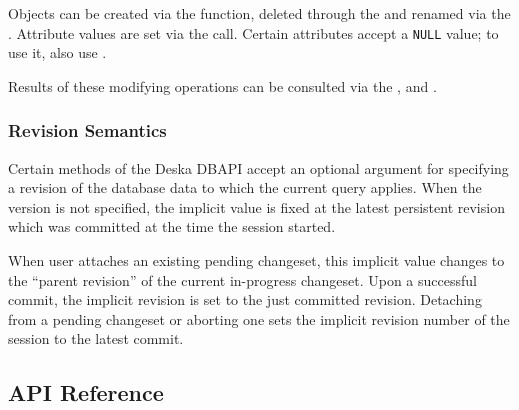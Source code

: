 \documentclass{article}
\begin{document}
Objects can be created via the  function, deleted through the  and
renamed via the .  Attribute values are set via the  call.
Certain attributes accept a {\tt NULL} value; to use it, also use .

Results of these modifying operations can be consulted via the ,
 and .

\subsubsection{Revision Semantics}
\label{sec:api-revision-semantics}

Certain methods of the Deska DBAPI accept an optional argument for specifying a revision of the database data to which
the current query applies.  When the version is not specified, the implicit value is fixed at the latest persistent
revision which was committed at the time the session started.

When user attaches an existing pending changeset, this implicit value changes to the ``parent revision'' of the
current in-progress changeset.  Upon a successful commit, the implicit revision is set to the just committed revision.
Detaching from a pending changeset or aborting one sets the implicit revision number of the session to the latest
commit.

\subsection{API Reference}

\newcommand{\deskaFunc}[5]
{\paragraph{#1}\label{sec:api-ref-#1}

{#4}

{#5}

\subparagraph{Sample JSON input} {\tt \{"command": "{#1}"{#2}\}}

\subparagraph{Sample JSON output} {\tt \{"response": "{#1}"{#2}, "{#1}": {#3}\}}

}

\setcounter{secnumdepth}{4}
\end{document}
